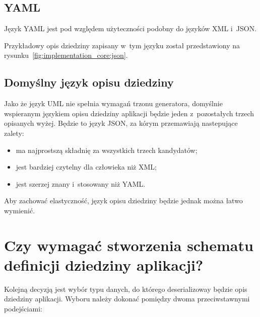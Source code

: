 


\subsection{YAML}

Język YAML jest pod względem użyteczności podobny do języków XML i~JSON.


Przykładowy opis dziedziny zapisany w~tym języku został przedstawiony na rysunku~\ref{fig:implementation_core:json}.




\subsection{Domyślny język opisu dziedziny}

Jako że język UML nie spełnia wymagań trzonu generatora, domyślnie wspieranym językiem opisu dziedziny aplikacji będzie jeden z~pozostałych trzech opisanych wyżej.
Będzie to język JSON, za kórym przemawiają nastepujące zalety:

\begin{itemize}
 \item ma najprostszą składnię za wszystkich trzech kandydatów;
 \item jest bardziej czytelny dla człowieka niż XML;
 \item jest szerzej znany i~stosowany niż YAML.
\end{itemize}

Aby zachować elastyczność, język opisu dziedziny będzie jednak można łatwo wymienić.



\section{Czy wymagać stworzenia schematu definicji dziedziny aplikacji?} \label{sec:core:domain_schema_requirement}

Kolejną decyzją jest wybór typu danych, do którego deserializoway będzie opis dziedziny aplikacji.
Wyboru należy dokonać pomiędzy dwoma przeciwstawnymi podejściami:


